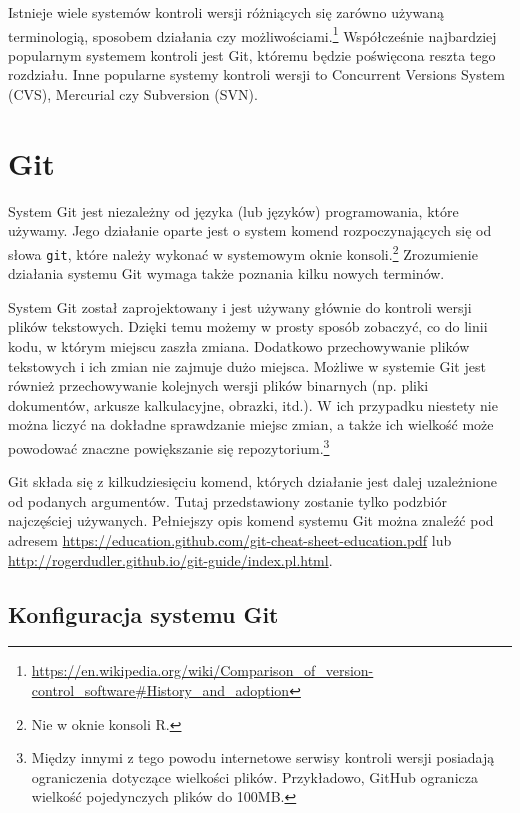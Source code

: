 \documentclass[paper=6in:9in,pagesize=pdftex,headinclude=on,footinclude=on,10pt]{scrbook}
\begin{document}
Istnieje wiele systemów kontroli wersji różniących się zarówno używaną terminologią, sposobem działania czy możliwościami.\footnote{\url{https://en.wikipedia.org/wiki/Comparison_of_version-control_software\#History_and_adoption}}
Współcześnie najbardziej popularnym systemem kontroli jest Git, któremu będzie poświęcona reszta tego rozdziału.
Inne popularne systemy kontroli wersji to Concurrent Versions System (CVS), Mercurial czy Subversion (SVN).

\hypertarget{git}{%
\section{Git}\label{git}}

System Git jest niezależny od języka (lub języków) programowania, które używamy.
Jego działanie oparte jest o system komend rozpoczynających się od słowa \texttt{git}, które należy wykonać w systemowym oknie konsoli.\footnote{Nie w oknie konsoli R.}
Zrozumienie działania systemu Git wymaga także poznania kilku nowych terminów.

System Git został zaprojektowany i jest używany głównie do kontroli wersji plików tekstowych.
Dzięki temu możemy w prosty sposób zobaczyć, co do linii kodu, w którym miejscu zaszła zmiana.
Dodatkowo przechowywanie plików tekstowych i ich zmian nie zajmuje dużo miejsca.
Możliwe w systemie Git jest również przechowywanie kolejnych wersji plików binarnych (np. pliki dokumentów, arkusze kalkulacyjne, obrazki, itd.).
W ich przypadku niestety nie można liczyć na dokładne sprawdzanie miejsc zmian, a także ich wielkość może powodować znaczne powiększanie się repozytorium.\footnote{Między innymi z tego powodu internetowe serwisy kontroli wersji posiadają ograniczenia dotyczące wielkości plików.
  Przykładowo, GitHub ogranicza wielkość pojedynczych plików do 100MB.}

Git składa się z kilkudziesięciu komend, których działanie jest dalej uzależnione od podanych argumentów.
Tutaj przedstawiony zostanie tylko podzbiór najczęściej używanych.
Pełniejszy opis komend systemu Git można znaleźć pod adresem \url{https://education.github.com/git-cheat-sheet-education.pdf} lub \url{http://rogerdudler.github.io/git-guide/index.pl.html}.

\hypertarget{konfiguracja-systemu-git}{%
\subsection{Konfiguracja systemu Git}\label{konfiguracja-systemu-git}}
\end{document}
